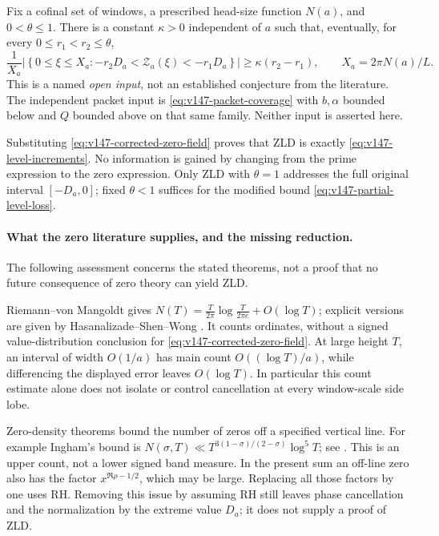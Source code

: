 \begin{assumption}
\label{ass:v147-zld}
Fix a cofinal set of windows, a prescribed head-size function $N(a)$,
and $0<\theta\le1$. There is a constant $\kappa>0$ independent of
$a$ such that, eventually, for every $0\le r_1<r_2\le\theta$,
\begin{equation}\label{eq:v147-zld}
 \frac1{X_a}\left|\left\{0\le\xi\le X_a:
  -r_2D_a<\mathcal Z_a(\xi)<-r_1D_a\right\}\right|
 \ge\kappa(r_2-r_1),\qquad X_a=2\pi N(a)/L.
\end{equation}
This is a named \emph{open input}, not an established conjecture from
the literature. The independent packet input is
\eqref{eq:v147-packet-coverage} with $b,\alpha$ bounded below and
$Q$ bounded above on that same family. Neither input is asserted here.
\end{assumption}
Substituting \eqref{eq:v147-corrected-zero-field} proves that ZLD is
exactly \eqref{eq:v147-level-increments}. No information is gained by
changing from the prime expression to the zero expression. Only ZLD
with $\theta=1$ addresses the full original interval $[-D_a,0]$;
fixed $\theta<1$ suffices for the modified bound
\eqref{eq:v147-partial-level-loss}.

\paragraph{What the zero literature supplies, and the missing reduction.}
The following assessment concerns the stated theorems, not a proof
that no future consequence of zero theory can yield ZLD.

Riemann--von Mangoldt gives
$N(T)=\frac{T}{2\pi}\log\frac{T}{2\pi e}+O(\log T)$; explicit
versions are given by Hasanalizade--Shen--Wong
\cite{HasanalizadeShenWong2022}. It counts ordinates, without a signed
value-distribution conclusion for \eqref{eq:v147-corrected-zero-field}.
At large height $T$, an interval of width $O(1/a)$ has main count
$O((\log T)/a)$, while differencing the displayed error leaves
$O(\log T)$. In particular this count estimate alone does not isolate
or control cancellation at every window-scale side lobe.

Zero-density theorems bound the number of zeros off a specified
vertical line. For example Ingham's bound is
$N(\sigma,T)\ll T^{3(1-\sigma)/(2-\sigma)}\log^5T$; see
\cite{Ingham1940,ChourasiyaSimonic2025}. This is an upper count,
not a lower signed band measure. In the present sum an off-line zero
also has the factor $x^{\Re\rho-1/2}$, which may be large. Replacing
all those factors by one uses RH. Removing this issue by assuming RH
still leaves phase cancellation and the normalization by the extreme
value $D_a$; it does not supply a proof of ZLD.

